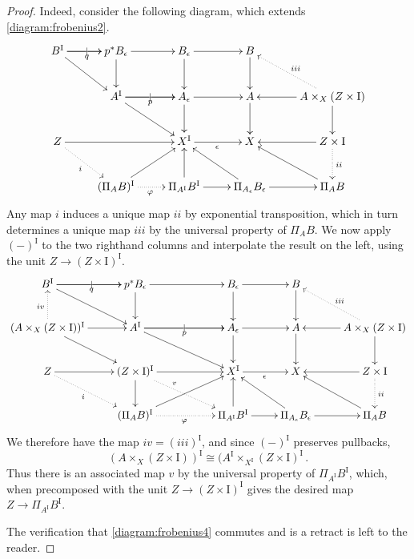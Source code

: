 \documentclass[11pt]{article}
\newcommand{\ra}{\ensuremath{\rightarrow}}
\newcommand{\I}{\ensuremath{\mathrm{I}}}
\theoremstyle{remark}
\theoremstyle{definition}
\begin{document}
\begin{proof}
Indeed, consider the following diagram, which extends \eqref{diagram:frobenius2}.
\begin{equation}\label{diagram:frobenius7}
\xymatrix{
B^\I \ar[r]|| \ar[r]_{q} \ar[rd]  & p^*B_\epsilon \ar[r]  \ar[d]  & B_{\epsilon}  \ar[d]   \ar[r] & B \ar[d]& \\
& A^\I \ar[r]|| \ar[r]_{p}  \ar[rd]  & A_{\epsilon} \ar[d]   \ar[r] & A \ar[d]& \ar[d] \ar[l] \ar@{..>}[lu]_{iii}A\times_X (Z\times \I) \\
Z \ar[rr] \ar@{..>}[rd]_-{i} && X^\I \ar[r]_{\epsilon} &  X & \ar[l] \ar@{..>}[d]^{ii} Z\times \I\\
& (\Pi_AB)^\I \ar[ru] \ar@{..>}[r]_\varphi  & \Pi_{A^\I}B^\I   \ar[u] \ar[r] & \Pi_{A_\epsilon}B_\epsilon  \ar[lu] \ar[r] & \Pi_AB \ar[lu]
}
\end{equation}
Any map $i$ induces a unique map $ii$ by exponential transposition, which in turn determines a unique map $iii$ by the universal property of $\Pi_AB$.  We now apply $(-)^\I$ to the two righthand columns and interpolate the result on the left, using the unit $Z \ra (Z\times \I)^\I$.
\begin{equation*}\label{diagram:frobenius8}
\xymatrix{
B^\I \ar[r]|| \ar[r]_{q} \ar[rd]  & p^*B_\epsilon \ar[rr]  \ar[d]  && B_{\epsilon}  \ar[d]   \ar[r] & B \ar[d]& \\
(A\times_X (Z\times \I))^\I \ar[r] \ar[rd] \ar@{..>}[u]^{iv} & A^\I \ar[rr]|| \ar[rr]_{p}  \ar[rrd]  && A_{\epsilon} \ar[d]   \ar[r] & A \ar[d]
	& \ar[d] \ar[l] \ar@{..>}[lu]_{iii} A\times_X (Z\times \I) \\
Z \ar[r] \ar@{..>}[rd]_-{i} & (Z\times \I)^\I \ar[rr] \ar[d] \ar@{..>}[rrd]^<<<<<<<{v} && X^\I \ar[r]_{\epsilon} &  X & \ar[l] \ar@{..>}[d]^{ii} Z\times \I\\
& (\Pi_AB)^\I \ar[rru] \ar@{..>}[rr]_\varphi  && \Pi_{A^\I}B^\I   \ar[u] \ar[r]  & \Pi_{A_\epsilon}B_\epsilon  \ar[lu] \ar[r] & \Pi_AB \ar[lu]
}
\end{equation*}
We therefore have the map $iv = (iii)^\I$, and since $(-)^\I$ preserves pullbacks,
\[
(A\times_X (Z\times \I))^\I \cong (A^\I\times_{X^\I} (Z\times \I)^\I\,.
\]  
Thus there is an associated map $v$ by the universal property of $\Pi_{A^\I}B^\I$, which, when precomposed with the unit $Z \ra (Z\times \I)^\I$ gives the desired map $Z \to \Pi_{A^\I}B^\I$.

The verification that \eqref{diagram:frobenius4} commutes and is a retract is left to the reader.
\end{proof}
\end{document}

